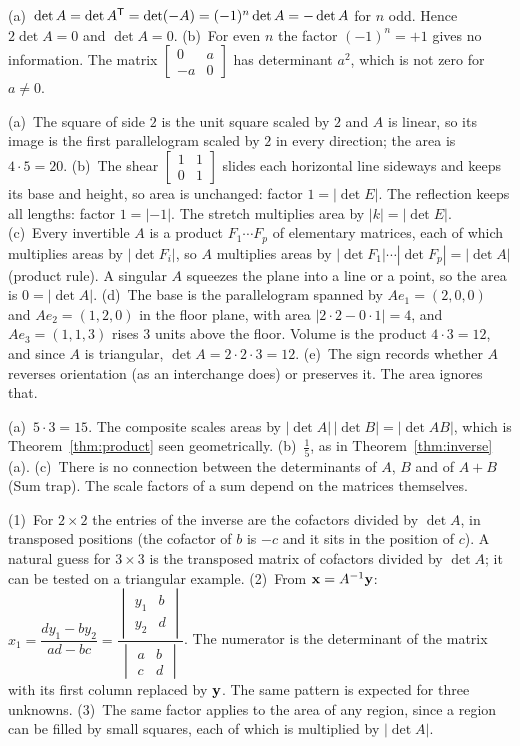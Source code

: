 \documentclass[11pt]{article}
\begin{document}
\begin{description}[leftmargin=0pt,itemsep=5pt]
  \item[Pause and think \ref{think:oddskew}.] (a)~$\det A=\det A^{\mathsf T}=\det(-A)=(-1)^n\det A=-\det A$ for $n$ odd. Hence $2\det A=0$ and $\det A=0$. (b)~For even $n$ the factor $(-1)^n=+1$ gives no information. The matrix $\begin{bmatrix}0&a\\-a&0\end{bmatrix}$ has determinant $a^2$, which is not zero for $a\neq0$.
  \item[Pause and think \ref{think:area}.] (a)~The square of side $2$ is the unit square scaled by $2$ and $A$ is linear, so its image is the first parallelogram scaled by $2$ in every direction; the area is $4\cdot5=20$. (b)~The shear $\begin{bmatrix}1&1\\0&1\end{bmatrix}$ slides each horizontal line sideways and keeps its base and height, so area is unchanged: factor $1=|\det E|$. The reflection keeps all lengths: factor $1=|-1|$. The stretch multiplies area by $|k|=|\det E|$. (c)~Every invertible $A$ is a product $F_1\cdots F_p$ of elementary matrices, each of which multiplies areas by $|\det F_i|$, so $A$ multiplies areas by $|\det F_1|\cdots|\det F_p|=|\det A|$ (product rule). A singular $A$ squeezes the plane into a line or a point, so the area is $0=|\det A|$. (d)~The base is the parallelogram spanned by $Ae_1=(2,0,0)$ and $Ae_2=(1,2,0)$ in the floor plane, with area $|2\cdot2-0\cdot1|=4$, and $Ae_3=(1,1,3)$ rises $3$ units above the floor. Volume is the product $4\cdot3=12$, and since $A$ is triangular, $\det A=2\cdot2\cdot3=12$. (e)~The sign records whether $A$ reverses orientation (as an interchange does) or preserves it. The area ignores that.
  \item[Pause and think \ref{think:scale}.] (a)~$5\cdot3=15$. The composite scales areas by $|\det A|\,|\det B|=|\det AB|$, which is Theorem~\ref{thm:product} seen geometrically. (b)~$\tfrac15$, as in Theorem~\ref{thm:inverse}(a). (c)~There is no connection between the determinants of $A$, $B$ and of $A+B$ (Sum trap). The scale factors of a sum depend on the matrices themselves.
  \item[Before the next section.] (1)~For $2\times2$ the entries of the inverse are the cofactors divided by $\det A$, in transposed positions (the cofactor of $b$ is $-c$ and it sits in the position of $c$). A natural guess for $3\times3$ is the transposed matrix of cofactors divided by $\det A$; it can be tested on a triangular example. (2)~From $\mathbf{x}=A^{-1}\mathbf{y}$: $x_1=\dfrac{dy_1-by_2}{ad-bc}=\dfrac{\begin{vmatrix}y_1&b\\y_2&d\end{vmatrix}}{\begin{vmatrix}a&b\\c&d\end{vmatrix}}$. The numerator is the determinant of the matrix with its first column replaced by $\mathbf{y}$. The same pattern is expected for three unknowns. (3)~The same factor applies to the area of any region, since a region can be filled by small squares, each of which is multiplied by $|\det A|$.
\end{description}
\end{document}
